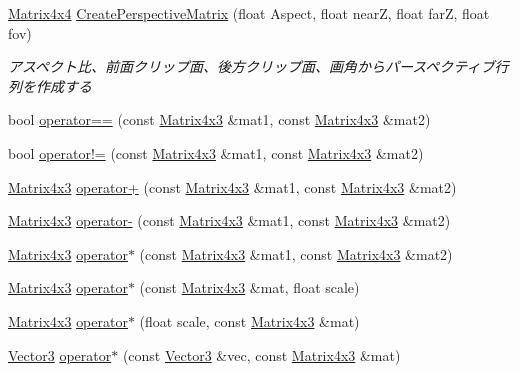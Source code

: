 \begin{DoxyCompactItemize}
\mbox{\hyperlink{struct_math_1_1_matrix4x4}{Matrix4x4}} \mbox{\hyperlink{namespace_math_a3a425ade3b937625acd000ced1caa45f}{Create\+Perspective\+Matrix}} (float Aspect, float nearZ, float farZ, float fov)
\begin{DoxyCompactList}\small\item\em アスペクト比、前面クリップ面、後方クリップ面、画角からパースペクティブ行列を作成する \end{DoxyCompactList}\item 
bool \mbox{\hyperlink{namespace_math_abf6196400c58b30a5a616aefccff2f14}{operator==}} (const \mbox{\hyperlink{struct_math_1_1_matrix4x3}{Matrix4x3}} \&mat1, const \mbox{\hyperlink{struct_math_1_1_matrix4x3}{Matrix4x3}} \&mat2)
\item 
bool \mbox{\hyperlink{namespace_math_a4834d702630aaf6717303b4faf834cd2}{operator!=}} (const \mbox{\hyperlink{struct_math_1_1_matrix4x3}{Matrix4x3}} \&mat1, const \mbox{\hyperlink{struct_math_1_1_matrix4x3}{Matrix4x3}} \&mat2)
\item 
\mbox{\hyperlink{struct_math_1_1_matrix4x3}{Matrix4x3}} \mbox{\hyperlink{namespace_math_a959ebc86863f66d4fb3bc96f3b0ad6be}{operator+}} (const \mbox{\hyperlink{struct_math_1_1_matrix4x3}{Matrix4x3}} \&mat1, const \mbox{\hyperlink{struct_math_1_1_matrix4x3}{Matrix4x3}} \&mat2)
\item 
\mbox{\hyperlink{struct_math_1_1_matrix4x3}{Matrix4x3}} \mbox{\hyperlink{namespace_math_a0fd0b23a7349545e6b45a09ea4758be4}{operator-\/}} (const \mbox{\hyperlink{struct_math_1_1_matrix4x3}{Matrix4x3}} \&mat1, const \mbox{\hyperlink{struct_math_1_1_matrix4x3}{Matrix4x3}} \&mat2)
\item 
\mbox{\hyperlink{struct_math_1_1_matrix4x3}{Matrix4x3}} \mbox{\hyperlink{namespace_math_a231015e930e4e65cfeb4d3ed35c5f60b}{operator$\ast$}} (const \mbox{\hyperlink{struct_math_1_1_matrix4x3}{Matrix4x3}} \&mat1, const \mbox{\hyperlink{struct_math_1_1_matrix4x3}{Matrix4x3}} \&mat2)
\item 
\mbox{\hyperlink{struct_math_1_1_matrix4x3}{Matrix4x3}} \mbox{\hyperlink{namespace_math_a9c473bb33aae64090197e0d686ad75c3}{operator$\ast$}} (const \mbox{\hyperlink{struct_math_1_1_matrix4x3}{Matrix4x3}} \&mat, float scale)
\item 
\mbox{\hyperlink{struct_math_1_1_matrix4x3}{Matrix4x3}} \mbox{\hyperlink{namespace_math_ab554e261e8209bde30f33f893c0f2bbb}{operator$\ast$}} (float scale, const \mbox{\hyperlink{struct_math_1_1_matrix4x3}{Matrix4x3}} \&mat)
\item 
\mbox{\hyperlink{struct_math_1_1_vector3}{Vector3}} \mbox{\hyperlink{namespace_math_abaac4a662eebe65536e53580498f7377}{operator$\ast$}} (const \mbox{\hyperlink{struct_math_1_1_vector3}{Vector3}} \&vec, const \mbox{\hyperlink{struct_math_1_1_matrix4x3}{Matrix4x3}} \&mat)

\end{DoxyCompactItemize}
